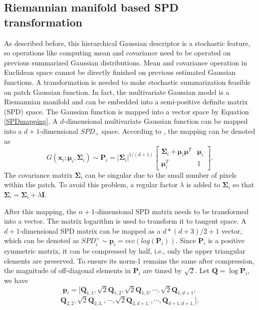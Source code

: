 \subsection{Riemannian manifold based SPD transformation}

As described before, this hierarchical Gaussian descriptor is a stochastic feature, so operations like computing mean and covariance need to be operated on previous summarized Gaussian distributions. Mean and covariance operation in Euclidean space cannot be directly finished on previous estimated Gaussian functions. A transformation is needed to make stochastic summarization feasible on patch Gaussian function.
In fact, the multivariate Gaussian model is a Riemannian manifold and can be embedded into a semi-positive definite matrix (SPD) space. The Gaussian function is mapped into a vector space by Equation \ref{SPDmapping}. A $d$-dimensional multivariate Gaussian function can be mapped into a $d+1$-dimensional $SPD_+$ space. According to \cite{MultiVarGau}, the mapping can be denoted as 
\begin{equation}\label{SPDmapping}
G(\bm{x}_i;\bm{\mu}_i,\bm{\Sigma}_i) \sim \bm{P}_i  = |\bm{\Sigma}_i|^{1/(d+1)} \left[ \begin{matrix}
\bm{\Sigma}_i + \bm{\mu}_i\bm{\mu}^T & \bm{\mu}_i \\
\bm{\mu}_i^T & 1
\end{matrix}
\right].
\end{equation}
The covariance matrix $\bm{\Sigma}_i$ can be singular due to the small number of pixels within the patch. To avoid this problem, a regular factor $\lambda$ is added to $\bm{\Sigma}_i$ so that $\bm{\Sigma}_i = \bm{\Sigma}_i + \lambda\bm{I}$. 

After this mapping, the $n+1$-dimensional SPD matrix needs to be transformed into a vector. The matrix logarithm is used to transform it to tangent space. A $d+1$-dimensional SPD matrix can be mapped as a $d*(d+3)/2+1$ vector, which can be denoted as $SPD_i^+ \sim \bm{p}_i = vec(log(\bm{P}_i))$. Since $\bm{P}_i$ is a positive symmetric matrix, it can be compressed by half, i.e., only the upper triangular elements are preserved. To ensure its norm-1 remains the same after compression, the magnitude of off-diagonal elements in $\bm{P}_i$ are timed by $\sqrt2$.  Let $\bm{Q}=\log{\bm{P}_i}$, we have
\begin{equation}\label{vectorize}
 \bm{p}_i = [\bm{Q}_{1,1},\sqrt2\bm{Q}_{1,2},\sqrt2\bm{Q}_{1,3},\cdots,\sqrt2\bm{Q}_{1,d+1},
 \end{equation}
 \begin{equation}
 \bm{Q}_{2,2},\sqrt2\bm{Q}_{2,3,},\cdots,\sqrt2\bm{Q}_{2,d+1,},\cdots,\bm{Q}_{d+1,d+1,}].
\end{equation}


